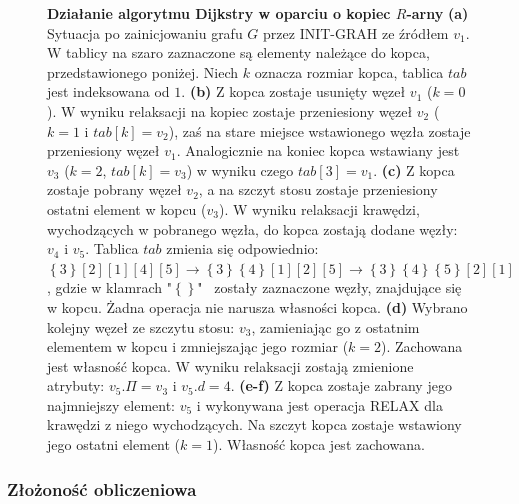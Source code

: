 \begin{figure}[!htbp]
\begin{subfigure}[b]{0.33\textwidth}
		\caption{}
	\end{subfigure}
	\caption{\textbf{Działanie algorytmu Dijkstry w oparciu o kopiec $R$-arny} \textbf{(a)} Sytuacja po zainicjowaniu grafu $G$ przez \textsf{INIT-GRAH} ze źródłem $v_{1}$. W tablicy na szaro zaznaczone są elementy należące do kopca, przedstawionego poniżej. Niech $k$ oznacza rozmiar kopca, tablica $tab$ jest indeksowana od $1$. \textbf{(b)} Z kopca zostaje usunięty węzeł $v_{1}$ ($k=0$). W wyniku relaksacji na kopiec zostaje przeniesiony węzeł $v_{2}$ ($k=1$ i $tab \left[ k \right] = v_{2}$), zaś na stare miejsce wstawionego węzła zostaje przeniesiony węzeł $v_{1}$. Analogicznie na koniec kopca wstawiany jest $v_{3}$  ($k=2$, $tab \left[ k \right] = v_{3}$) w wyniku czego $tab \left[ 3 \right] = v_{1}$. \textbf{(c)} Z kopca zostaje pobrany węzeł $v_{2}$, a na szczyt stosu zostaje przeniesiony ostatni element w kopcu ($v_{3}$). W wyniku relaksacji krawędzi, wychodzących w pobranego węzła, do kopca zostają dodane węzły: $v_{4}$ i $v_{5}$. Tablica $tab$ zmienia się odpowiednio: $\left\{ 3 \right\} \left[ 2 \right]  \left[ 1 \right]  \left[ 4 \right]  \left[ 5 \right] \rightarrow \left\{ 3 \right\} \left\{ 4 \right\}  \left[ 1 \right]  \left[ 2 \right]  \left[ 5 \right] \rightarrow \left\{ 3 \right\} \left\{ 4 \right\}  \left\{ 5 \right\}  \left[ 2 \right]  \left[ 1 \right]$, gdzie w klamrach "$\left\{\right\}$"~ zostały zaznaczone węzły, znajdujące się w kopcu. Żadna operacja nie narusza własności kopca. \textbf{(d)} Wybrano kolejny węzeł ze szczytu stosu: $v_{3}$, zamieniając go z ostatnim elementem w kopcu i zmniejszając jego rozmiar ($k=2$). Zachowana jest własność kopca. W wyniku relaksacji zostają zmienione atrybuty: $v_{5}.\Pi = v_{3}$ i $v_{5}.d = 4$. \textbf{(e-f)} Z kopca zostaje zabrany jego najmniejszy element: $v_{5}$ i wykonywana jest operacja \textsf{RELAX} dla krawędzi z niego wychodzących. Na szczyt kopca zostaje wstawiony jego ostatni element ($k=1$). Własność kopca jest zachowana.} \label{fig:exampleDHeap}
\end{figure}

\subsubsection{Złożoność obliczeniowa}

